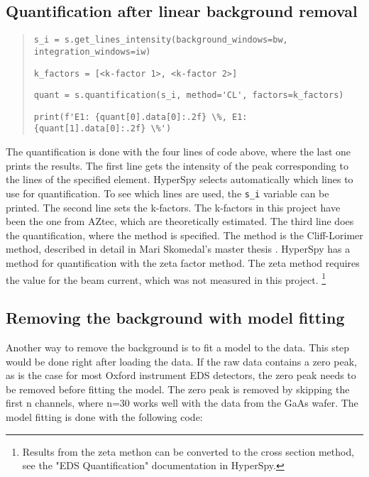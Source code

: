 \subsection{Quantification after linear background removal}
\label{sec:results:steps:quantification:linear}

\begin{quote}
    \verb|s_i = s.get_lines_intensity(background_windows=bw, integration_windows=iw)|

    \verb|k_factors = [<k-factor 1>, <k-factor 2>]  |

    \verb|quant = s.quantification(s_i, method='CL', factors=k_factors)|

    \verb|print(f'E1: {quant[0].data[0]:.2f} \%, E1: {quant[1].data[0]:.2f} \%')|
\end{quote}

The quantification is done with the four lines of code above, where the last one prints the results.
The first line gets the intensity of the peak corresponding to the lines of the specified element.
HyperSpy selects automatically which lines to use for quantification.
To see which lines are used, the \verb|s_i| variable can be printed.
The second line sets the k-factors.
The k-factors in this project have been the one from AZtec, which are theoretically estimated.
The third line does the quantification, where the method is specified.
The method is the Cliff-Lorimer method, described in detail in Mari Skomedal's master thesis \cite[Sec. 2.2.3]{skomedal_improving_2022}.
HyperSpy has a method for quantification with the zeta factor method.
The zeta method requires the value for the beam current, which was not measured in this project. \footnote{Results from the zeta methon can be converted to the cross section method, see the "EDS Quantification" documentation in HyperSpy.}



\subsection{Removing the background with model fitting}
\label{sec:results:steps:model_fitting}
Another way to remove the background is to fit a model to the data.
This step would be done right after loading the data.
If the raw data contains a zero peak, as is the case for most Oxford instrument EDS detectors, the zero peak needs to be removed before fitting the model.
The zero peak is removed by skipping the first n channels, where n=30 works well with the data from the GaAs wafer.
The model fitting is done with the following code:

